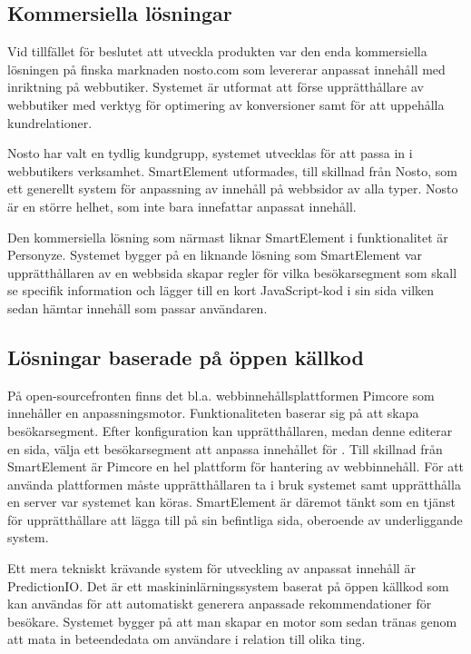 \subsection{Kommersiella lösningar}

Vid tillfället för beslutet att utveckla produkten var den enda kommersiella lösningen på finska marknaden nosto.com som levererar anpassat innehåll med inriktning på webbutiker. Systemet är utformat att förse upprätthållare av webbutiker med verktyg för optimering av konversioner samt för att uppehålla kundrelationer. \citep{nosto}

Nosto har valt en tydlig kundgrupp, systemet utvecklas för att passa in i webbutikers verksamhet. SmartElement utformades, till skillnad från Nosto, som ett generellt system för anpassning av innehåll på webbsidor av alla typer. Nosto är en större helhet, som inte bara innefattar anpassat innehåll.

Den kommersiella lösning som närmast liknar SmartElement i funktionalitet är Personyze. Systemet bygger på en liknande lösning som SmartElement var upprätthållaren av en webbsida skapar regler för vilka besökarsegment som skall se specifik information och lägger till en kort JavaScript-kod i sin sida vilken sedan hämtar innehåll som passar användaren. \citep{personyze}

\subsection{Lösningar baserade på öppen källkod}

På open-sourcefronten finns det bl.a. webbinnehållsplattformen Pimcore som innehåller en anpassningsmotor. Funktionaliteten baserar sig på att skapa besökarsegment. Efter konfiguration kan upprätthållaren, medan denne editerar en sida, välja ett besökarsegment att anpassa innehållet för \citep{pimcore}.
Till skillnad från SmartElement är Pimcore en hel plattform för hantering av webbinnehåll. För att använda plattformen måste upprätthållaren ta i bruk systemet samt upprätthålla en server var systemet kan köras. SmartElement är däremot tänkt som en tjänst för upprätthållare att lägga till på sin befintliga sida, oberoende av underliggande system.

Ett mera tekniskt krävande system för utveckling av anpassat innehåll är PredictionIO. Det är ett maskininlärningssystem baserat på öppen källkod som kan användas för att automatiskt generera anpassade rekommendationer för besökare. Systemet bygger på att man skapar en motor som sedan tränas genom att mata in beteendedata om användare i relation till olika ting. \citep{predicionioconcepts}


